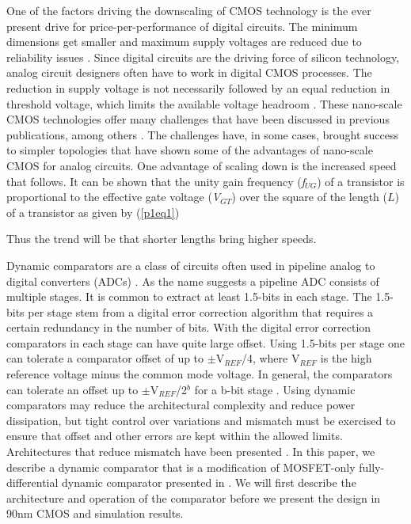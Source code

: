 One of the factors driving the downscaling of CMOS technology is the
ever present drive for price-per-performance of digital circuits. The
minimum dimensions get smaller and maximum supply voltages are reduced
due to reliability issues \cite{iwai99}.
Since digital circuits are the driving force of silicon technology,
analog circuit designers often have to work in digital CMOS processes.
The reduction in supply voltage is not necessarily followed by an equal
reduction in threshold voltage, which limits the available voltage
headroom \cite{annema05}. 
These nano-scale CMOS technologies offer many challenges that have
been discussed in previous publications, among others \cite{iwai99,annema05,annema04}.
The challenges have, in some cases, brought success to simpler
topologies \cite{draxelmayr04}
that have shown some of the advantages of nano-scale CMOS for analog
circuits. One advantage of scaling down is the increased speed that
follows. It can be shown that the unity gain frequency
(\textit{f$_{UG}$}) of a transistor is proportional to the effective
gate voltage (\textit{V$_{GT}$}) over the square of the length
(\begin{math}L\end{math}) of a transistor as given by (\ref{p1eq1})
\cite{annema05}

Thus the trend will be that shorter lengths bring higher speeds.

Dynamic comparators are a class of circuits often used in pipeline
analog to digital converters (ADCs) \cite{cho95}.
 As the name suggests a pipeline ADC consists of multiple stages. It
is common to extract at least 1.5-bits in each stage. The 1.5-bits per
stage stem from a digital error correction algorithm that requires a
certain redundancy in the number of bits. With the digital error
correction comparators in each stage can have quite large offset. Using
1.5-bits per stage one can tolerate a comparator offset of up to
\begin{math}\pm{}\end{math}V$_{REF}$/4, where V$_{REF}$ is the high
reference voltage minus the common mode voltage. In general, the
comparators can tolerate an offset up to
\begin{math}\pm{}\end{math}V$_{REF}$/2$^{b}$ for a b-bit stage
\cite{sumanen00}.
Using dynamic comparators may reduce the architectural complexity
and reduce power dissipation, but tight control over variations and
mismatch must be exercised to ensure that offset and other errors are
kept within the allowed limits. Architectures that reduce mismatch have
been presented \cite{sumanen00}.
In this paper, we describe a dynamic comparator that is a
modification of MOSFET-only fully-differential dynamic comparator
presented in \cite{lofti03}.
 We will first describe the architecture and operation of the
comparator before we present the design in 90nm CMOS and simulation
results.
 

